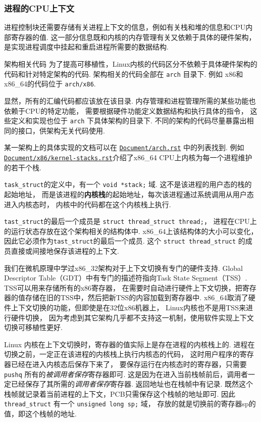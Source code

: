 \subsubsection{进程的CPU上下文}
进程控制块还需要存储有关进程上下文的信息，例如有关栈和堆的信息和CPU内部寄存器的值.
这一部分信息既和内核的内存管理有关又依赖于具体的硬件架构，
是实现进程调度中挂起和重启进程所需要的数据结构.
\begin{readsrcbox}{架构相关代码}
	为了提高可移植性，Linux内核的代码区分不依赖于具体硬件架构的代码和针对特定架构的代码.
	架构相关的代码全部在 \lstinline{arch} 目录下.
	例如 x86和x86\_64的代码位于 \lstinline{arch/x86}.

	显然，所有的汇编代码都应该放在该目录.
	内存管理和进程管理所需的某些功能也依赖于CPU的特定功能，
	需要根据硬件功能定义数据结构和执行具体的指令，
	这些定义和实现也位于 \lstinline{arch} 下具体架构的目录下.
	不同的架构的代码尽量暴露出相同的接口，供架构无关代码使用.

	某一架构上的具体实现的文档可以在 \href{https://docs.kernel.org/arch.html}{\lstinline{Document/arch.rst}} 中的列表找到.
	例如\href{https://docs.kernel.org/x86/kernel-stacks.html}{\lstinline{Document/x86/kernel-stacks.rst}}介绍了x86\_64 CPU上内核为每一个进程维护的若干个栈.
\end{readsrcbox}
\lstinline{task_struct}的定义中，有一个 \lstinline{void *stack;} 域.
这不是该进程的用户态的栈的起始地址，
而是该进程的\textbf{内核栈}的起始地址，每次该进程通过系统调用从用户态进入内核态时，
内核中的代码都在这个内核栈上执行.

\lstinline{tast_struct}的最后一个成员是 \lstinline{struct thread_struct thread;}，
进程在CPU上的运行状态存放在这个架构相关的结构体中.
x86\_64上该结构体的大小可以变化，因此它必须作为\lstinline{tast_struct}的最后一个成员.
这个 \lstinline{struct thread_struct} 的成员直接或间接地保存该进程的上下文.

我们在微机原理中学过x86\_32架构对于上下文切换有专门的硬件支持.
Global Descriptor Table（GDT）中有专门的描述符指向Task State Segment（TSS）.
TSS可以用来存储所有的x86寄存器，
在需要时自动进行硬件上下文切换，把寄存器的值存储在旧的TSS中，然后把新TSS的内容加载到寄存器中.
x86\_64取消了硬件上下文切换的功能，但即使是在32位x86机器上，
Linux内核也不是用TSS来进行硬件切换，
因为考虑到其它架构几乎都不支持这一机制，使用软件实现上下文切换可移植性更好.

Linux 内核在上下文切换时，寄存器的值实际上是存在进程的内核栈上的.
进程在切换之前，一定正在该进程的内核栈上执行内核态的代码，
这时用户程序的寄存器已经在进入内核态后保存下来了，
要保存运行在内核态时的寄存器，只需要 \lstinline{pushq} 所有的\textit{被调用者保存}寄存器即可.
这是因为在进入当前栈帧前后，调用者一定已经保存了其所需的\textit{调用者保存}寄存器.
返回地址也在栈帧中有记录.
既然这个栈帧就记录着当前进程的上下文，PCB只需保存这个栈帧的地址即可.
因此 \lstinline{thread_struct} 有一个 \lstinline{unsigned long sp;} 域，
存放的就是切换前的寄存器sp的值，即这个栈帧的地址.

